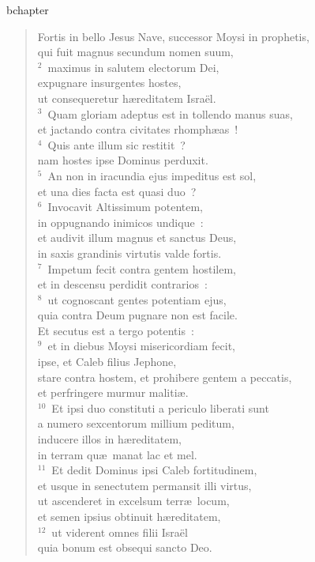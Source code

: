 bchapter\begin{verse}\vspace{-19pt}Fortis in bello Jesus Nave, successor Moysi in prophetis,\\ qui fuit magnus secundum nomen suum,\\
${}^{2}$~maximus in salutem electorum Dei,\\ expugnare insurgentes hostes,\\ ut consequeretur h\ae reditatem Isra\"el.\\
${}^{3}$~Quam gloriam adeptus est in tollendo manus suas,\\ et jactando contra civitates rhomph\ae as~!\\
${}^{4}$~Quis ante illum sic restitit~?\\ nam hostes ipse Dominus perduxit.\\
${}^{5}$~An non in iracundia ejus impeditus est sol,\\ et una dies facta est quasi duo~?\\
${}^{6}$~Invocavit Altissimum potentem,\\ in oppugnando inimicos undique~:\\ et audivit illum magnus et sanctus Deus,\\ in saxis grandinis virtutis valde fortis.\\
${}^{7}$~Impetum fecit contra gentem hostilem,\\ et in descensu perdidit contrarios~:\\
${}^{8}$~ut cognoscant gentes potentiam ejus,\\ quia contra Deum pugnare non est facile.\\ Et secutus est a tergo potentis~:\\
${}^{9}$~et in diebus Moysi misericordiam fecit,\\ ipse, et Caleb filius Jephone,\\ stare contra hostem, et prohibere gentem a peccatis,\\ et perfringere murmur maliti\ae .\\
${}^{10}$~Et ipsi duo constituti a periculo liberati sunt\\ a numero sexcentorum millium peditum,\\ inducere illos in h\ae reditatem,\\ in terram qu\ae\ manat lac et mel.\\
${}^{11}$~Et dedit Dominus ipsi Caleb fortitudinem,\\ et usque in senectutem permansit illi virtus,\\ ut ascenderet in excelsum terr\ae\ locum,\\ et semen ipsius obtinuit h\ae reditatem,\\
${}^{12}$~ut viderent omnes filii Isra\"el\\ quia bonum est obsequi sancto Deo.\end{verse}



